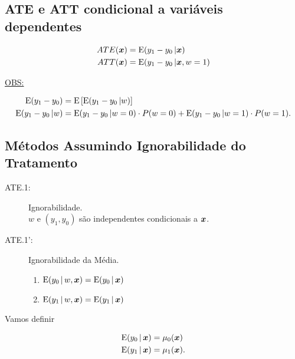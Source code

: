 \documentclass[11pt, oneside, a4paper, article]{article}
\numberwithin{equation}{section}
\begin{document}
\begin{description}
	\subsection{ATE e ATT condicional a variáveis dependentes}

	\vspace{-1 em}
	\begin{align*}
		ATE( \boldsymbol{x} ) &= \text{E}( y_1 - y_0 \, | \boldsymbol{x})
		\\
		ATT( \boldsymbol{x} ) &= \text{E}( y_1 - y_0 \, | \boldsymbol{x}, w = 1)
	\end{align*}

	\noindent
	\underline{OBS:}

	\vspace{-1 em}
	\begin{align*}
		\text{E}( y_1 - y_0 ) &= \text{E} \left[ \text{E}( y_1 - y_0 \, | w) \right]
		\\
		\text{E}( y_1 - y_0 \, | w ) &=
		\text{E}( y_1 - y_0 \, | w = 0 ) \cdot P(w=0)
		+
		\text{E}( y_1 - y_0 \, | w = 1 ) \cdot P(w=1).
	\end{align*}

	\subsection{Métodos Assumindo Ignorabilidade do Tratamento}

	\begin{description}
		\item[ATE.1:] Ignorabilidade. 
			\\
			$w$ e $(y_{1}, y_{0})$ são independentes condicionais a $\boldsymbol{x}$.

		\item[ATE.1':] Ignorabilidade da Média. 

			\vspace{-.75 em}
			\begin{enumerate}[label =\alph*)] \itemsep0pt
			\item $\text{E}( y_{0} \, | \, w, \boldsymbol{x} ) = \text{E}( y_{0} \, | \, \boldsymbol{x} )$
			\item $\text{E}( y_{1} \, | \, w, \boldsymbol{x} ) = \text{E}( y_{1} \, | \, \boldsymbol{x} )$
		\end{enumerate}

\end{description}

Vamos definir

\vspace{-1 em}
\begin{align*}
	\text{E}( y_{0} \, | \, \boldsymbol{x} ) &= \mu_{0}( \boldsymbol{x} )
	\\
	\text{E}( y_{1} \, | \, \boldsymbol{x} ) &= \mu_{1}( \boldsymbol{x} ).
\end{align*}


\end{description}
\end{document}
